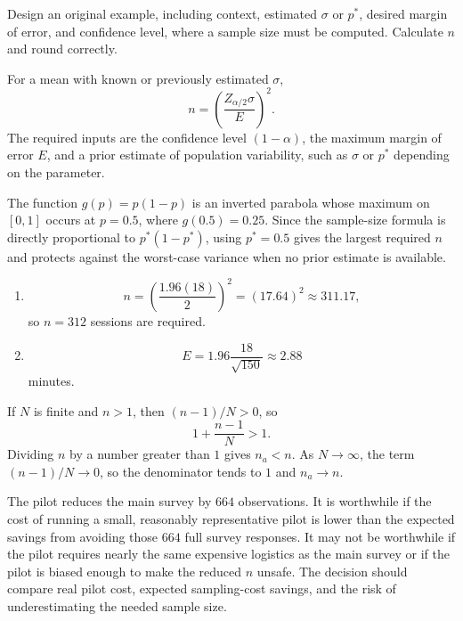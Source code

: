 \begin{problema}\label{prob:a691b8d}
Design an original example, including context, estimated $\sigma$ or $p^*$, desired margin of error, and confidence level, where a sample size must be computed. Calculate $n$ and round correctly.
\end{problema}

\begin{solproblema}[prob:01c5fc7]
For a mean with known or previously estimated $\sigma$,
\[
	n=\left(\frac{Z_{\alpha/2}\sigma}{E}\right)^2.
\]
The required inputs are the confidence level $(1-\alpha)$, the maximum margin of error $E$, and a prior estimate of population variability, such as $\sigma$ or $p^*$ depending on the parameter.
\end{solproblema}

\begin{solproblema}[prob:f82cc83]
The function $g(p)=p(1-p)$ is an inverted parabola whose maximum on $[0,1]$ occurs at $p=0.5$, where $g(0.5)=0.25$. Since the sample-size formula is directly proportional to $p^*(1-p^*)$, using $p^*=0.5$ gives the largest required $n$ and protects against the worst-case variance when no prior estimate is available.
\end{solproblema}

\begin{solproblema}[prob:f57d73c]
\begin{enumerate}[label=(\alph*)]
	\item
	\[
		n=\left(\frac{1.96(18)}{2}\right)^2=(17.64)^2\approx311.17,
	\]
	so $n=312$ sessions are required.
	\item
	\[
		E=1.96\frac{18}{\sqrt{150}}\approx2.88
	\]
	minutes.
\end{enumerate}
\end{solproblema}

\begin{solproblema}[prob:2e73754]
If $N$ is finite and $n>1$, then $(n-1)/N>0$, so
\[
	1+\frac{n-1}{N}>1.
\]
Dividing $n$ by a number greater than $1$ gives $n_a<n$. As $N\to\infty$, the term $(n-1)/N\to0$, so the denominator tends to $1$ and $n_a\to n$.
\end{solproblema}

\begin{solproblema}[prob:d79f0c1]
The pilot reduces the main survey by $664$ observations. It is worthwhile if the cost of running a small, reasonably representative pilot is lower than the expected savings from avoiding those $664$ full survey responses. It may not be worthwhile if the pilot requires nearly the same expensive logistics as the main survey or if the pilot is biased enough to make the reduced $n$ unsafe. The decision should compare real pilot cost, expected sampling-cost savings, and the risk of underestimating the needed sample size.
\end{solproblema}

